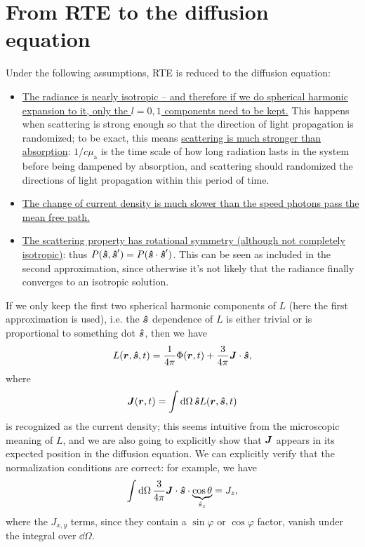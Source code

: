 \documentclass[hyperref, a4paper]{article}
\begin{document}
\section{From RTE to the diffusion equation}

Under the following assumptions, RTE is reduced to the diffusion equation: 
\begin{itemize}
    \item \ul{The radiance is nearly isotropic 
    -- and therefore if we do spherical harmonic expansion to it, 
    only the $l = 0, 1$ components need to be kept.} 
    This happens when scattering is strong enough 
    so that the direction of light propagation 
    is randomized; 
    to be exact, this means \ul{scattering is much stronger than absorption}:
    $1 / c \mu_{\text{a}}$ is the time scale of 
    how long radiation lasts in the system before being dampened by absorption, 
    and scattering should randomized the directions of light propagation 
    within this period of time. 
    \item \ul{The change of current density is much slower 
    than the speed photons pass the mean free path.}
    \item \ul{The scattering property has rotational symmetry (although not completely isotropic)}:
        thus $P(\vu*{s}, \vu*{s}') = P(\vu*{s} \cdot \vu*{s}')$.
        This can be seen as included in the second approximation, 
        since otherwise it's not likely that the radiance finally converges to 
        an isotropic solution.
\end{itemize}

If we only keep the first two spherical harmonic components of $L$
(here the first approximation is used), 
i.e. the $\vu*{s}$ dependence of $L$ 
is either trivial 
or is proportional to something dot $\vu*{s}$, 
then we have
\begin{equation}
    L(\vb*{r}, \vu*{s}, t) = \frac{1}{4 \pi} \Phi(\vb*{r}, t) 
    + \frac{3}{4 \pi} \vb*{J} \cdot \vu*{s},
\end{equation}
where 
\begin{equation}
    \vb*{J}(\vb*{r}, t) = \int \dd{\Omega} \vu*{s} L(\vb*{r}, \vu*{s}, t)
\end{equation}
is recognized as the current density; 
this seems intuitive from the microscopic meaning of $L$,
and we are also going to explicitly show that $\vb*{J}$
appears in its expected position in the diffusion equation.
We can explicitly verify that the normalization conditions are correct: 
for example, we have 
\begin{equation}
    \int \dd{\Omega} \frac{3}{4 \pi} \vb*{J} \cdot \vu*{s} \cdot \underbrace{\cos \theta}_{\hat{s}_z} = 
    J_z, 
\end{equation} 
where the $J_{x, y}$ terms, since they contain a $\sin \varphi$ or $\cos \varphi$ factor, 
vanish under the integral over $\dd \Omega$. 
\end{document}
